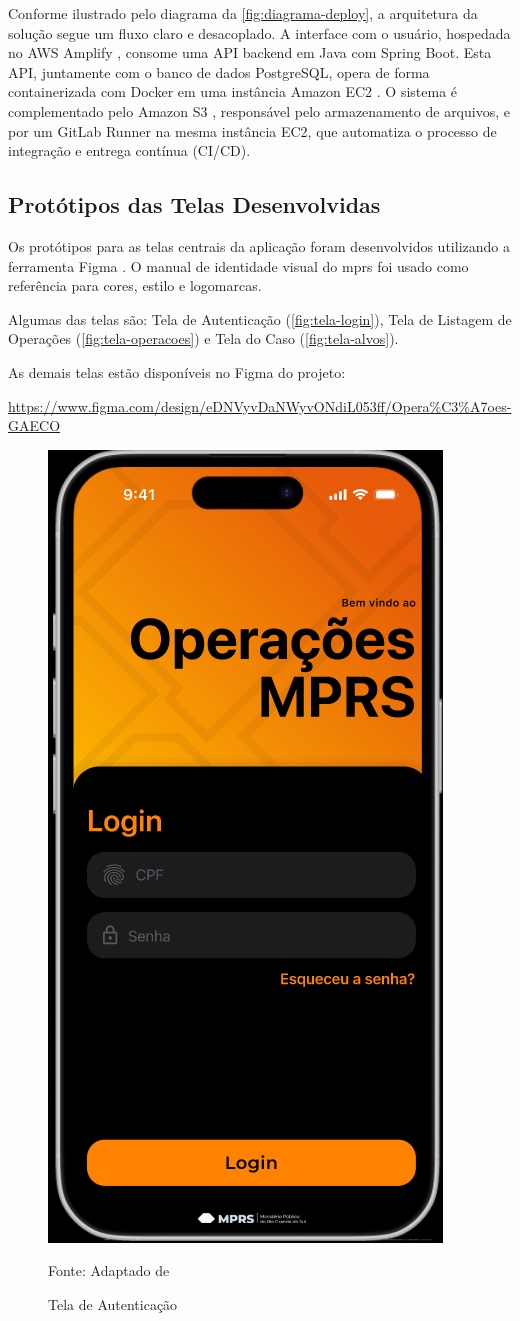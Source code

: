   Conforme ilustrado pelo diagrama da \autoref{fig:diagrama-deploy}, a arquitetura da solução segue um fluxo claro e desacoplado. A interface com o usuário, hospedada no AWS Amplify \cite{amplify}, consome uma API backend em Java \cite{python} com Spring Boot. Esta API, juntamente com o banco de dados PostgreSQL, opera de forma containerizada com Docker \cite{docker} em uma instância Amazon EC2 \cite{ec2}. O sistema é complementado pelo Amazon S3 \cite{s3}, responsável pelo armazenamento de arquivos, e por um GitLab Runner \cite{gitlabrunner} na mesma instância EC2, que automatiza o processo de integração e entrega contínua (CI/CD).

\subsection{Protótipos das Telas Desenvolvidas}
  Os protótipos para as telas centrais da aplicação foram desenvolvidos utilizando a ferramenta Figma \cite{figma}. O manual de identidade visual do \acs{mprs} foi usado como referência para cores, estilo e logomarcas. 
  
  Algumas das telas são: Tela de Autenticação (\autoref{fig:tela-login}), Tela de Listagem de Operações (\autoref{fig:tela-operacoes}) e Tela do Caso (\autoref{fig:tela-alvos}).

  As demais telas estão disponíveis no Figma do projeto:
  
  \url{https://www.figma.com/design/eDNVyvDaNWyvONdiL053ff/Opera%C3%A7oes-GAECO}

  \begin{figure}[H]
    \centering
    \small
    \includegraphics[width=0.4\linewidth]{conteudo//2 - ages I//conteudo//figures//tela-login.png}
    \caption{Tela de Autenticação}
    Fonte: Adaptado de \textcites{figma-Operacoes GAECO}
    \label{fig:tela-login}
  \end{figure}

